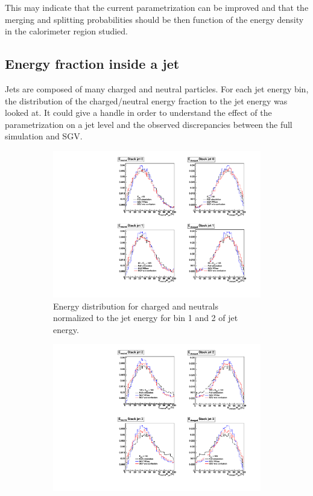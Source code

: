 This may indicate that the current parametrization can be improved and that the merging and splitting probabilities should be then function of the energy density in the calorimeter region studied.

\subsection{Energy fraction inside a jet}

Jets are composed of many charged and neutral particles. For each jet energy bin, the distribution of the charged/neutral energy fraction to the jet energy was looked at. It could give a handle in order to understand the effect of the parametrization on a jet level and the observed discrepancies between the full simulation and SGV.

\begin{figure}[htbp!]
  \centering
  \begin{subfigure}[t]{0.45\textwidth}
    \centering
    \includegraphics[width=1\linewidth]{../Thesis_Plots/SGV/Plots/EneuEcha_binned_1.pdf}
    \caption{Energy distribution for charged and neutrals normalized to the jet energy for bin 1 and 2 of jet energy.} \label{fig:jet_track_level_bins12}
  \end{subfigure}
  \hfill
  \begin{subfigure}[t]{0.45\textwidth}
    \centering
    \includegraphics[width=1\linewidth]{../Thesis_Plots/SGV/Plots/EneuEcha_binned_2.pdf}

\end{subfigure}
\end{figure}
